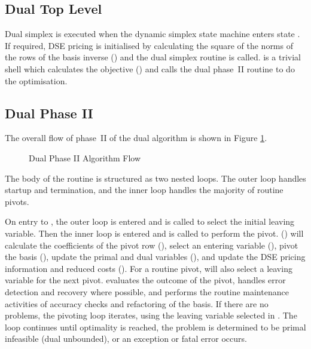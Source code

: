 \subsection{Dual Top Level}

Dual simplex is executed when the dynamic simplex state machine enters state
.
If required, DSE pricing is initialised by calculating the square of the
norms of the rows of the basis inverse (\vid {})
and the dual simplex routine  is called.
 is a trivial shell which calculates
the objective () and calls the dual phase~II
routine  to do the optimisation.

\subsection{Dual Phase II}

The overall flow of phase~II of the dual algorithm is shown in Figure
\ref{fig:DualPhaseIIFlow}.
\begin{figure}[htbp]
\begin{center}
\end{center}
\caption{Dual Phase II Algorithm Flow} \label{fig:DualPhaseIIFlow}
\end{figure}
The body of the routine is structured as two nested loops.
The outer loop handles startup and termination, and the inner loop handles
the majority of routine pivots.

On entry to , the outer loop is entered and 
is called to select the initial leaving variable.
Then the inner loop is entered and  is called to perform
the pivot.
 (\vid {}) will
calculate the coefficients of the pivot row (),
select an entering variable (),
pivot the basis (),
update the primal and dual variables (),
and update the DSE pricing information and reduced costs ().
For a routine pivot,  will also select a leaving variable
for the next pivot.
 evaluates the outcome of the pivot, handles error detection
and recovery where possible, and performs the routine maintenance activities
of accuracy checks and refactoring of the basis.
If there are no problems, the pivoting loop iterates, using the leaving
variable selected in .
The loop continues until optimality is reached, the problem is determined to
be primal infeasible (dual unbounded), or an exception or fatal error occurs.

